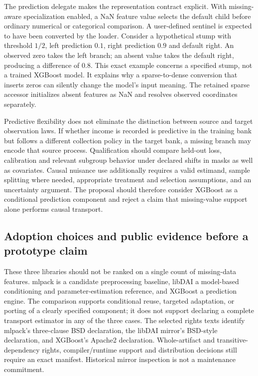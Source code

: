 The prediction delegate makes the representation contract explicit. With missing-aware specialization enabled, a NaN feature value selects the default child before ordinary numerical or categorical comparison. A user-defined sentinel is expected to have been converted by the loader. Consider a hypothetical stump with threshold $1/2$, left prediction $0.1$, right prediction $0.9$ and default right. An observed zero takes the left branch; an absent value takes the default right, producing a difference of $0.8$. This exact example concerns a specified stump, not a trained XGBoost model. It explains why a sparse-to-dense conversion that inserts zeros can silently change the model's input meaning. The retained sparse accessor initializes absent features as NaN and resolves observed coordinates separately.~\citep{exec25_ctm_xgboost,exec25_ctm_choice}

Predictive flexibility does not eliminate the distinction between source and target observation laws. If whether income is recorded is predictive in the training bank but follows a different collection policy in the target bank, a missing branch may encode that source process. Qualification should compare held-out loss, calibration and relevant subgroup behavior under declared shifts in masks as well as covariates. Causal nuisance use additionally requires a valid estimand, sample splitting where needed, appropriate treatment and selection assumptions, and an uncertainty argument. The proposal should therefore consider XGBoost as a conditional prediction component and reject a claim that missing-value support alone performs causal transport.~\citep{exec25_ctm_choice}

\subsection*{Adoption choices and public evidence before a prototype claim}
These three libraries should not be ranked on a single count of missing-data features. mlpack is a candidate preprocessing baseline, libDAI a model-based conditioning and parameter-estimation reference, and XGBoost a prediction engine. The comparison supports conditional reuse, targeted adaptation, or porting of a clearly specified component; it does not support declaring a complete transport estimator in any of the three cases. The selected rights texts identify mlpack's three-clause BSD declaration, the libDAI mirror's BSD-style declaration, and XGBoost's Apache2 declaration. Whole-artifact and transitive-dependency rights, compiler/runtime support and distribution decisions still require an exact manifest. Historical mirror inspection is not a maintenance commitment.~\citep{exec25_ctm_mlpack,exec25_ctm_libdai,exec25_ctm_xgboost,exec25_ctm_choice}

